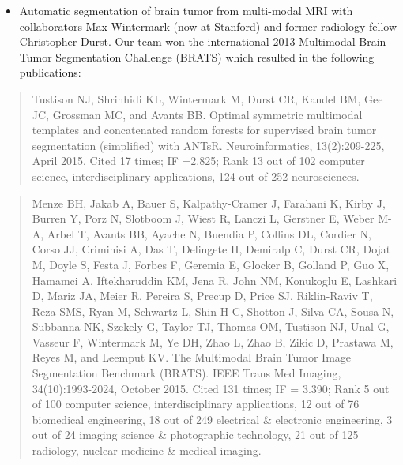 \documentclass[11pt,]{article}
\providecommand{\tightlist}{%
  \setlength{\itemsep}{0pt}\setlength{\parskip}{0pt}}
\begin{document}
\begin{itemize}
  \begin{itemize}
  \tightlist
  \item
    Automatic segmentation of brain tumor from multi-modal MRI with
    collaborators Max Wintermark (now at Stanford) and former radiology
    fellow Christopher Durst. Our team won the international 2013
    Multimodal Brain Tumor Segmentation Challenge (BRATS) which resulted
    in the following publications:
  \end{itemize}

  \begin{quote}
  Tustison NJ, Shrinhidi KL, Wintermark M, Durst CR, Kandel BM, Gee JC,
  Grossman MC, and Avants BB. Optimal symmetric multimodal templates and
  concatenated random forests for supervised brain tumor segmentation
  (simplified) with ANTsR. Neuroinformatics, 13(2):209-225, April 2015.
  Cited 17 times; IF =2.825; Rank 13 out of 102 computer science,
  interdisciplinary applications, 124 out of 252 neurosciences.
  \end{quote}

  \begin{quote}
  Menze BH, Jakab A, Bauer S, Kalpathy-Cramer J, Farahani K, Kirby J,
  Burren Y, Porz N, Slotboom J, Wiest R, Lanczi L, Gerstner E, Weber
  M-A, Arbel T, Avants BB, Ayache N, Buendia P, Collins DL, Cordier N,
  Corso JJ, Criminisi A, Das T, Delingete H, Demiralp C, Durst CR, Dojat
  M, Doyle S, Festa J, Forbes F, Geremia E, Glocker B, Golland P, Guo X,
  Hamamci A, Iftekharuddin KM, Jena R, John NM, Konukoglu E, Lashkari D,
  Mariz JA, Meier R, Pereira S, Precup D, Price SJ, Riklin-Raviv T, Reza
  SMS, Ryan M, Schwartz L, Shin H-C, Shotton J, Silva CA, Sousa N,
  Subbanna NK, Szekely G, Taylor TJ, Thomas OM, Tustison NJ, Unal G,
  Vasseur F, Wintermark M, Ye DH, Zhao L, Zhao B, Zikic D, Prastawa M,
  Reyes M, and Leemput KV. The Multimodal Brain Tumor Image Segmentation
  Benchmark (BRATS). IEEE Trans Med Imaging, 34(10):1993-2024, October
  2015. Cited 131 times; IF = 3.390; Rank 5 out of 100 computer science,
  interdisciplinary applications, 12 out of 76 biomedical engineering,
  18 out of 249 electrical \& electronic engineering, 3 out of 24
  imaging science \& photographic technology, 21 out of 125 radiology,
  nuclear medicine \& medical imaging.
  \end{quote}


\end{itemize}
\end{document}
